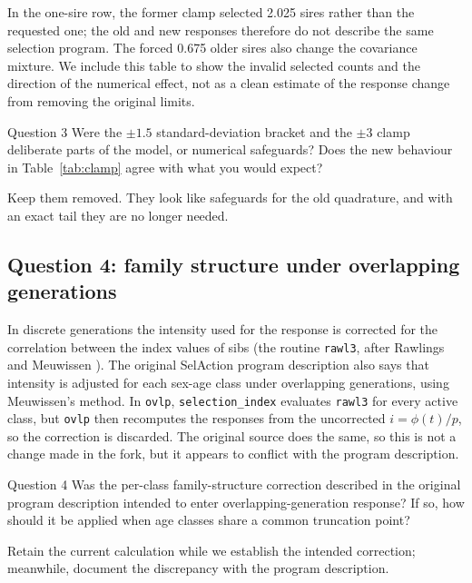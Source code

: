 \documentclass[11pt]{article}
\newcommand{\src}[1]{\texttt{#1}}
\begin{document}
In the one-sire row, the former clamp selected 2.025 sires rather than the requested one; the old and new responses therefore do not describe the same selection program. The forced 0.675 older sires also change the covariance mixture. We include this table to show the invalid selected counts and the direction of the numerical effect, not as a clean estimate of the response change from removing the original limits.

\begin{question}{Question 3}
Were the $\pm1.5$ standard-deviation bracket and the $\pm3$ clamp deliberate parts of the model, or numerical safeguards? Does the new behaviour in Table~\ref{tab:clamp} agree with what you would expect?
\end{question}
\begin{recommend}
Keep them removed. They look like safeguards for the old quadrature, and with an exact tail they are no longer needed.
\end{recommend}

\subsection{Question 4: family structure under overlapping generations}
In discrete generations the intensity used for the response is corrected for the correlation between the index values of sibs (the routine \src{rawl3}, after Rawlings \cite{rawlings1976} and Meuwissen \cite{meuwissen1991}). The original SelAction program description also says that intensity is adjusted for each sex-age class under overlapping generations, using Meuwissen's method. In \src{ovlp}, \src{selection\_index} evaluates \src{rawl3} for every active class, but \src{ovlp} then recomputes the responses from the uncorrected $i=\phi(t)/p$, so the correction is discarded. The original source does the same, so this is not a change made in the fork, but it appears to conflict with the program description.

\begin{question}{Question 4}
Was the per-class family-structure correction described in the original program description intended to enter overlapping-generation response? If so, how should it be applied when age classes share a common truncation point?
\end{question}
\begin{recommend}
Retain the current calculation while we establish the intended correction; meanwhile, document the discrepancy with the program description.
\end{recommend}
\end{document}
